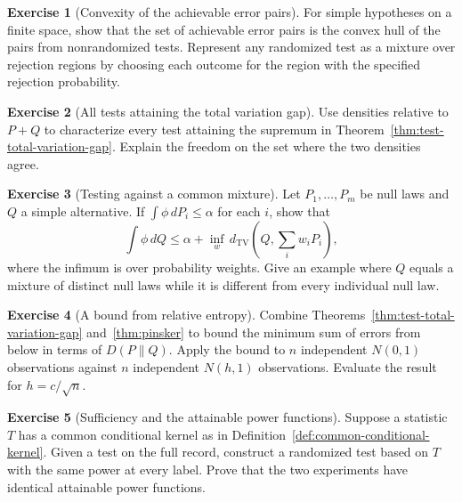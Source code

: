 \documentclass[11pt,oneside]{book}
\theoremstyle{definition}
\newtheorem{exercise}{Exercise}[section]
\theoremstyle{remark}
\begin{document}
\begin{exercise}[Convexity of the achievable error pairs]
\label{exer:test-error-region-finite}
For simple hypotheses on a finite space, show that the set of
achievable error pairs is the convex hull of the pairs from
nonrandomized tests. Represent any randomized test as a
mixture over rejection regions by choosing each outcome for
the region with the specified rejection probability.
\end{exercise}

\begin{exercise}[All tests attaining the total variation gap]
\label{exer:test-tv-equality-set}
Use densities relative to $P+Q$ to characterize every test attaining
the supremum in Theorem~\ref{thm:test-total-variation-gap}.
Explain the freedom on the set where the two densities agree.
\end{exercise}

\begin{exercise}[Testing against a common mixture]
\label{exer:test-composite-mixture-tv}
Let $P_1,\ldots,P_m$ be null laws and $Q$ a simple alternative.
If $\int\phi\,dP_i\leq\alpha$ for each $i$, show that
\[
\int\phi\,dQ\leq\alpha+
\inf_{w}\,d_{\mathrm{TV}}\!\left(Q,\sum_i w_iP_i\right),
\]
where the infimum is over probability weights. Give an example
where $Q$ equals a mixture of distinct null laws while it is
different from every individual null law.
\end{exercise}

\begin{exercise}[A bound from relative entropy]
\label{exer:test-error-sum-pinsker}
Combine Theorems~\ref{thm:test-total-variation-gap}
and~\ref{thm:pinsker} to bound the minimum sum of errors from
below in terms of $D(P\|Q)$. Apply the bound to $n$ independent
$N(0,1)$ observations against $n$ independent $N(h,1)$
observations. Evaluate the result for $h=c/\sqrt n$.
\end{exercise}

\begin{exercise}[Sufficiency and the attainable power functions]
\label{exer:test-sufficiency-power-region}
Suppose a statistic $T$ has a common conditional kernel as in
Definition~\ref{def:common-conditional-kernel}. Given a test on
the full record, construct a randomized test based on $T$ with
the same power at every label. Prove that the two experiments
have identical attainable power functions.
\end{exercise}
\end{document}
